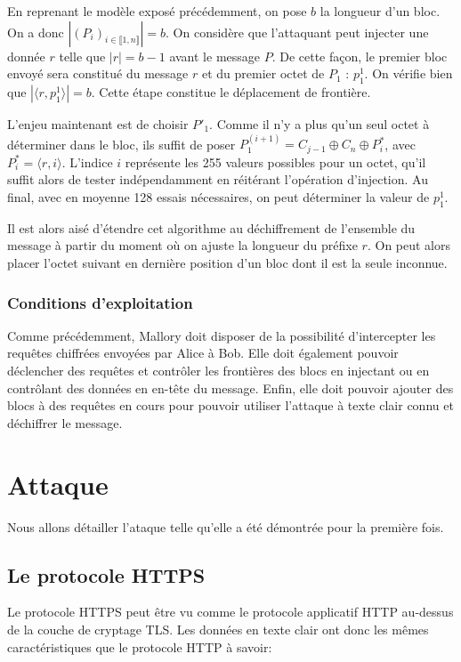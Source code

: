 \documentclass[a4paper,twoside]{article}
\begin{document}
En reprenant le modèle exposé précédemment, on pose $b$ la longueur d'un
bloc. On a donc $|{(P_i)}_{i\in \llbracket 1, n \rrbracket}| = b$. On
considère que l'attaquant peut injecter une donnée $r$ telle que $|r|=b-1$
avant le message $P$. De cette façon, le premier bloc envoyé sera constitué
du message $r$ et du premier octet de $P_1$ : $p_1^1$. On vérifie bien que
$|\langle r, p_1^1\rangle | = b$. Cette étape constitue le déplacement de
frontière.

L'enjeu maintenant est de choisir $P'_1$. Comme il n'y a plus qu'un seul
octet à déterminer dans le bloc, ils suffit de poser $P^{(i+1)}_1 =
C_{j-1}\oplus C_n\oplus P^*_i$, avec $P^*_i = \langle r, i\rangle$. L'indice
$i$ représente les 255 valeurs possibles pour un octet, qu'il suffit alors
de tester indépendamment en réitérant l'opération d'injection.
Au final, avec en moyenne 128 essais nécessaires, on peut déterminer la
valeur de $p_1^1$.

Il est alors aisé d'étendre cet algorithme au déchiffrement de l'ensemble du
message à partir du moment où on ajuste la longueur du préfixe $r$. On peut
alors placer l'octet suivant en dernière position d'un bloc dont il est la
seule inconnue.

\subsubsection{Conditions d'exploitation}

Comme précédemment, Mallory doit disposer de la possibilité d'intercepter
les requêtes chiffrées envoyées par Alice à Bob. Elle doit également pouvoir
déclencher des requêtes et contrôler les frontières des blocs en injectant
ou en contrôlant des données en en-tête du message. Enfin, elle doit pouvoir
ajouter des blocs à des requêtes en cours pour pouvoir utiliser l'attaque à
texte clair connu et déchiffrer le message.

\section{Attaque}

Nous allons détailler l'ataque telle qu'elle a été démontrée pour la
première fois.

\subsection{Le protocole HTTPS}

Le protocole HTTPS peut être vu comme le protocole applicatif HTTP au-dessus
de la couche de cryptage TLS. Les données en texte clair ont donc les mêmes
caractéristiques que le protocole HTTP à savoir:
\end{document}
